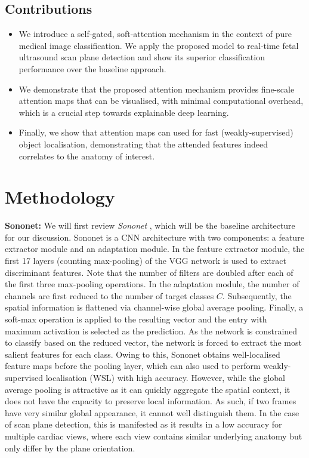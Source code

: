 \documentclass{article}
\begin{document}
\subsection{Contributions}

\begin{itemize}
\item We introduce a self-gated, soft-attention mechanism in the context of pure medical image classification. We apply the proposed model to real-time fetal ultrasound scan plane detection and show its superior classification performance over the baseline approach.

\item We demonstrate that the proposed attention mechanism provides fine-scale attention maps that can be visualised, with minimal computational overhead, which is a crucial step towards explainable deep learning. 

\item Finally, we show that attention maps can used for fast (weakly-supervised) object localisation, demonstrating that the attended features indeed correlates to the anatomy of interest.
\end{itemize}

\section{Methodology}

\textbf{Sononet:} We will first review \emph{Sononet} \cite{baumgartner2016real}, which will be the baseline architecture for our discussion. Sononet is a CNN architecture with two components: a feature extractor module and an adaptation module. In the feature extractor module, the first 17 layers (counting max-pooling) of the VGG network \cite{simonyan2014very} is used to extract discriminant features. Note that the number of filters are doubled after each of the first three max-pooling operations. In the adaptation module, the number of channels are first reduced to the number of target classes $C$. Subsequently, the spatial information is flattened via channel-wise global average pooling. Finally, a soft-max operation is applied to the resulting vector and the entry with maximum activation is selected as the prediction. As the network is constrained to classify based on the reduced vector, the network is forced to extract the most salient features for each class. Owing to this, Sononet obtains well-localised feature maps before the pooling layer, which can also used to perform weakly-supervised localisation (WSL) with high accuracy. However, while the global average pooling is attractive as it can quickly aggregate the spatial context, it does not have the capacity to preserve local information. As such, if two frames have very similar global appearance, it cannot well distinguish them. In the case of scan plane detection, this is manifested as it results in a low accuracy for multiple cardiac views, where each view contains similar underlying anatomy but only differ by the plane orientation. 
\end{document}
